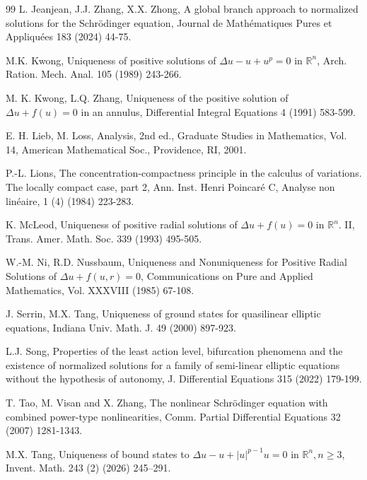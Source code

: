 \documentclass{article}
\theoremstyle{definition} \theoremstyle{remark}
\numberwithin{equation}{section}
\newcommand{\R}{\mathbb{R}}
\begin{document}
\begin{thebibliography}{99}
 L. Jeanjean, J.J. Zhang, X.X. Zhong, A global branch approach to normalized solutions for the Schr\"odinger equation, Journal de Math\'ematiques Pures et Appliqu\'ees 183 (2024) 44-75.

 M.K. Kwong, Uniqueness of positive solutions of $\Delta u - u + u^p = 0$ in $\R^n$, Arch. Ration. Mech. Anal. 105 (1989) 243-266.

 M. K. Kwong, L.Q. Zhang, Uniqueness of the positive solution of $\Delta u + f(u) = 0$ in an annulus, Differential Integral Equations 4 (1991) 583-599.

 E. H. Lieb, M. Loss, Analysis, 2nd ed., Graduate Studies in Mathematics, Vol. 14, American Mathematical Soc., Providence, RI, 2001.

 P.-L. Lions, The concentration-compactness principle in the calculus of variations. The locally compact case, part 2, Ann. Inst. Henri Poincar\'e C, Analyse non lin\'eaire, 1 (4) (1984) 223-283.

 K. McLeod, Uniqueness of positive radial solutions of $\Delta u + f(u) = 0$ in $\R^n$. II, Trans. Amer. Math. Soc. 339 (1993) 495-505.



   W.-M. Ni, R.D. Nussbaum, Uniqueness and Nonuniqueness for Positive Radial Solutions of $\Delta u + f(u, r) = 0$, Communications on Pure and Applied Mathematics, Vol. XXXVIII (1985) 67-108.




 J. Serrin, M.X. Tang, Uniqueness of ground states for quasilinear elliptic equations, Indiana Univ. Math. J. 49 (2000) 897-923.

 L.J. Song, Properties of the least action level, bifurcation phenomena and the existence of normalized solutions for a family of semi-linear elliptic equations without the hypothesis of autonomy, J. Differential Equations 315 (2022) 179-199.
    
    
 T. Tao, M. Visan and X. Zhang, The nonlinear Schr\"odinger equation with combined power-type nonlinearities, Comm. Partial Differential Equations 32 (2007) 1281-1343. 
    
    

  M.X.  Tang,  Uniqueness of bound states to $\Delta u-u+ |u|^{p-1} u=0$ in $\R^n, n\geq 3$, Invent. Math. 243 (2) (2026) 245–291.





\end{thebibliography}
\end{document}
